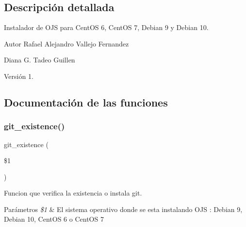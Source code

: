 \subsection{Descripción detallada}
Instalador de O\+JS para Cent\+OS 6, Cent\+OS 7, Debian 9 y Debian 10. 

\begin{DoxyAuthor}{Autor}
Rafael Alejandro Vallejo Fernandez 

Diana G. Tadeo Guillen 
\end{DoxyAuthor}
\begin{DoxyVersion}{Versión}
1. 
\end{DoxyVersion}


\subsection{Documentación de las funciones}
\mbox{\label{OJS__Instalador__General_8sh_acb263c3e6443d96a7048d5e672616b9d}} 
\subsubsection{\texorpdfstring{git\+\_\+existence()}{git\_existence()}}
{\footnotesize\ttfamily git\+\_\+existence (\begin{DoxyParamCaption}\item[{}]{\$1 }\end{DoxyParamCaption})}



Funcion que verifica la existencia o instala git. 


\begin{DoxyParams}{Parámetros}
{\em \$1} & El sistema operativo donde se esta instalando O\+JS \+: \textquotesingle{}Debian 9\textquotesingle{}, \textquotesingle{}Debian 10\textquotesingle{}, \textquotesingle{}Cent\+OS 6\textquotesingle{} o \textquotesingle{}Cent\+OS 7\textquotesingle{} \\
\hline
\end{DoxyParams}
\mbox{\label{OJS__Instalador__General_8sh_a9608ed294e757cd331743fa2d2f68d13}} 
